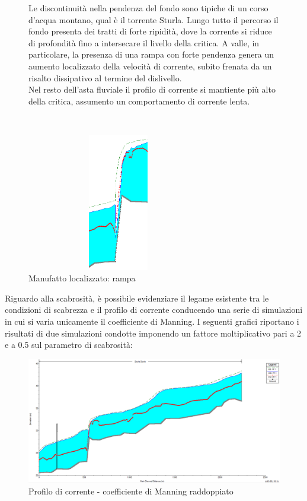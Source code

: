 \documentclass[12pt]{article} %
\begin{document}
\begin{figure}[H]
\begin{minipage}[b]{8.5cm}
\noindent Le discontinuità nella pendenza del fondo sono tipiche di un corso d'acqua montano, qual è il torrente Sturla. Lungo tutto il percorso il fondo presenta dei tratti di forte ripidità, dove la corrente si riduce di profondità fino a intersecare il livello della critica. A valle, in particolare, la presenza di una rampa con forte pendenza genera un aumento localizzato della velocità di corrente, subito frenata da un risalto dissipativo al termine del dislivello.\\
Nel resto dell'asta fluviale il profilo di corrente si mantiente più alto della critica, assumento un comportamento di corrente lenta.

\end{minipage}
\ \hspace{2mm} \hspace{3mm} \
\begin{minipage}[b]{8.5cm}
    \centering
    \includegraphics[height=6cm, width=8cm]{Risalto.PNG}
    \caption{Manufatto localizzato: rampa}
\end{minipage}
\end{figure}

\newpage

\noindent Riguardo alla scabrosità, è possibile evidenziare il legame esistente tra le condizioni di scabrezza e il profilo di corrente conducendo una serie di simulazioni in cui si varia unicamente il coefficiente di Manning.
I seguenti grafici riportano i risultati di due simulazioni condotte imponendo un fattore moltiplicativo pari a 2 e a 0.5 sul parametro di scabrosità:

\begin{figure}[H]
    \centering
    \includegraphics[scale=0.45]{Manningx2.PNG}
    \caption{Profilo di corrente - coefficiente di Manning raddoppiato}
\end{figure}
\end{document}
